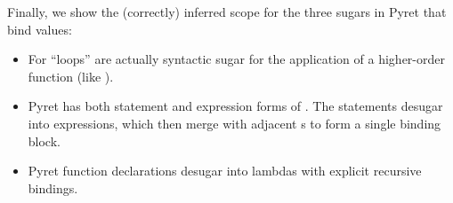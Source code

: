   Finally, we show the (correctly) inferred scope for the three sugars
  in Pyret that bind values:
  \begin{itemize}
  
  \item For ``loops'' are actually syntactic sugar for the application of a
    higher-order function (like ).
  
  \item Pyret has both statement and expression forms of . The
    statements desugar into  expressions, which then merge
    with adjacent s to form a single binding block.
  
  \item Pyret function declarations desugar into lambdas with explicit
    recursive bindings.
  
  \end{itemize}

